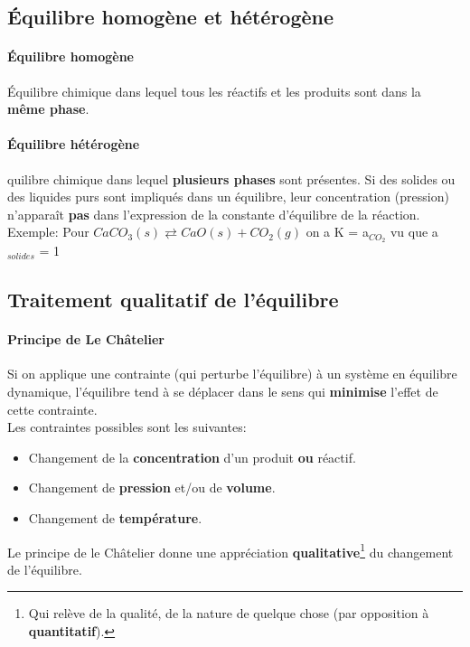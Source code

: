 \documentclass[10pt,a4paper]{book}
\begin{document}
\subsection{Équilibre homogène et hétérogène}

\paragraph{Équilibre homogène} Équilibre chimique dans lequel tous les réactifs et les produits sont dans la \textbf{même phase}.
\paragraph{Équilibre hétérogène} 	quilibre chimique dans lequel \textbf{plusieurs phases} sont présentes. Si des solides ou des liquides purs sont impliqués dans un équilibre, leur concentration (pression) n'apparaît \textbf{pas} dans l'expression de la constante d'équilibre de la réaction. \\
Exemple: Pour \(CaCO_3(s) \rightleftarrows CaO(s) + CO_2(g)\) on a K = a$_{CO_2}$ vu que a$_{solides}$ = 1

\subsection{Traitement qualitatif de l'équilibre}

\paragraph{Principe de Le Châtelier} Si on applique une contrainte (qui perturbe l'équilibre)
à un système en équilibre dynamique, l'équilibre tend à se déplacer dans le sens qui \textbf{minimise} l'effet de cette contrainte. \\
Les contraintes possibles sont les suivantes:
\begin{itemize}
\item Changement de la \textbf{concentration} d'un produit \textbf{ou} réactif.
\item Changement de \textbf{pression} et/ou de \textbf{volume}.
\item Changement de \textbf{température}.
\end{itemize} \par
Le principe de le Châtelier donne une appréciation \textbf{qualitative}\footnote{Qui relève de la qualité, de la nature de quelque chose (par opposition à \textbf{quantitatif}).} du changement de l'équilibre.
\end{document}
